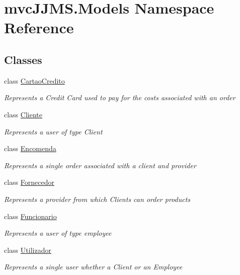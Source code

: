 \hypertarget{namespacemvc_j_j_m_s_1_1_models}{}\section{mvc\+J\+J\+M\+S.\+Models Namespace Reference}
\label{namespacemvc_j_j_m_s_1_1_models}
\subsection*{Classes}
\begin{DoxyCompactItemize}
\item 
class \mbox{\hyperlink{classmvc_j_j_m_s_1_1_models_1_1_cartao_credito}{Cartao\+Credito}}
\begin{DoxyCompactList}\small\item\em Represents a Credit Card used to pay for the costs associated with an order \end{DoxyCompactList}\item 
class \mbox{\hyperlink{classmvc_j_j_m_s_1_1_models_1_1_cliente}{Cliente}}
\begin{DoxyCompactList}\small\item\em Represents a user of type Client \end{DoxyCompactList}\item 
class \mbox{\hyperlink{classmvc_j_j_m_s_1_1_models_1_1_encomenda}{Encomenda}}
\begin{DoxyCompactList}\small\item\em Represents a single order associated with a client and provider \end{DoxyCompactList}\item 
class \mbox{\hyperlink{classmvc_j_j_m_s_1_1_models_1_1_fornecedor}{Fornecedor}}
\begin{DoxyCompactList}\small\item\em Represents a provider from which Clients can order products \end{DoxyCompactList}\item 
class \mbox{\hyperlink{classmvc_j_j_m_s_1_1_models_1_1_funcionario}{Funcionario}}
\begin{DoxyCompactList}\small\item\em Represents a user of type employee \end{DoxyCompactList}\item 
class \mbox{\hyperlink{classmvc_j_j_m_s_1_1_models_1_1_utilizador}{Utilizador}}
\begin{DoxyCompactList}\small\item\em Represents a single user whether a Client or an Employee \end{DoxyCompactList}\end{DoxyCompactItemize}
